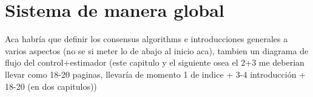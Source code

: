 
\newpage
\thispagestyle{empty}
\mbox{}
\chapter{Sistema de manera global}
\label{ch:chapter2}

Aca habría que definir los consensus algorithms e introducciones generales a varios aspectos (no se si meter lo de abajo al inicio aca), tambien un diagrama de flujo del control+estimador (este capitulo y el siguiente osea el 2+3 me deberian llevar como 18-20 paginas, llevaría de momento 1 de indice + 3-4 introducción + 18-20 (en dos capitulos))
